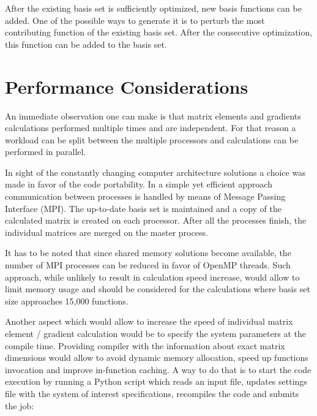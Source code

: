 After the existing basis set is sufficiently optimized, 
new basis functions can be added. One of the possible 
ways to generate it is to perturb the most contributing
function of the existing basis set. After the consecutive
optimization, this function can be added to the basis set.

\section{Performance Considerations}

An immediate observation one can make is that matrix elements
and gradients calculations performed multiple times and are
independent. For that reason a workload can be split between 
the multiple processors and calculations can be performed 
in parallel. 

In sight of the constantly changing computer architecture 
solutions a choice was made in favor of the code portability.
In a simple yet efficient approach communication between
processes is handled by means of Message Passing Interface (MPI).
The up-to-date basis set is maintained and
a copy of the calculated matrix is created on each processor.
After all the processes finish, the individual matrices are merged
on the master process.

It has to be noted that since shared memory solutions become 
available, the number of MPI processes can be reduced in favor 
of OpenMP threads. Such approach, while unlikely to result 
in calculation speed increase, would allow to limit memory 
usage and should be considered for the calculations where
basis set size approaches 15,000 functions.

Another aspect which would allow to increase the speed of individual
matrix element / gradient calculation would be to specify the system
parameters at the compile time. Providing compiler with the information
about exact matrix dimensions would allow to avoid dynamic memory
allocation, speed up functions invocation and improve in-function
caching. A way to do that is to start the code execution by 
running a Python script which reads an input file, updates 
settings file with the system of interest specifications,
recompiles the code and submits the job:







